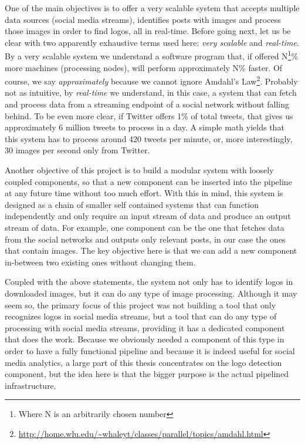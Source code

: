 One of the main objectives is to offer a very scalable system that accepts
multiple data sources (social media streams), identifies posts with images and
process those images in order to find logos, all in real-time. Before going
next, let us be clear with two apparently exhaustive terms used here:
\textit{very scalable} and \textit{real-time}. By a very scalable
system we understand a software program that, if offered
N\footnote{Where N is an arbitrarily chosen number}\% more
machines (processing nodes), will perform approximately N\% faster.
Of course, we say \textit{approximately} because we cannot ignore Amdahl's
Law\footnote{\url{http://home.wlu.edu/~whaleyt/classes/parallel/topics/amdahl.html}}.
Probably not as intuitive, by \textit{real-time} we understand, in this case, a
system that can fetch and process data from a streaming endpoint of a social
network without falling behind. To be even more clear, if Twitter offers
1\% of total tweets, that gives us approximately 6 million tweets to
process in a day. A simple math yields that this system has to process around
420 tweets per minute, or, more interestingly, 30 images per second only from
Twitter.

Another objective of this project is to build a modular system with loosely
coupled components, so that a new component can be inserted into the pipeline
at any future time without too much effort. With this in mind, this system is
designed as a chain of smaller self contained systems that can function
independently and only require an input stream of data and produce
an output stream of data. For example, one component can be the one that
fetches data from the social networks and outputs only relevant posts, in our
case the ones that contain images. The key objective here is that we can add
a new component in-between two existing ones without changing them.

Coupled with the above statements, the system not only has to identify logos
in downloaded images, but it can do any type of image processing. Although it
may seem so, the primary focus of this project was not building a tool that
only recognizes logos in social media streams, but a tool that can do any type
of processing with social media streams, providing it has a dedicated
component that does the work. Because we obviously needed a component of this type
in order to have a fully functional pipeline and because it is indeed useful
for social media analytics, a large part of this thesis concentrates on the
logo detection component, but the idea here is that the bigger purpose is the
actual pipelined infrastructure.

